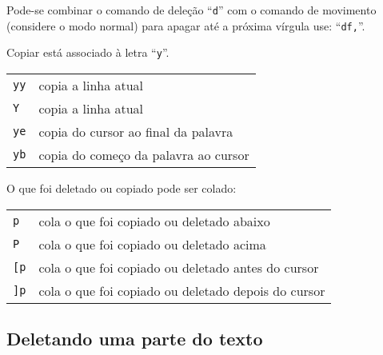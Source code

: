 {\Large {}} Pode-se combinar o comando de deleção ``\verb+d+'' com o
comando de movimento (considere o modo normal) para apagar até a
próxima vírgula use: ``\verb+df,+''. 

Copiar está associado à letra ``\verb|y|''.

\begin{table}[htb]\begin{center} \begin{tabular}{ll} \hline
     \verb|yy| & copia a linha atual \\
     \verb|Y| & copia a linha atual \\
     \verb|ye| & copia do cursor ao final da palavra \\
     \verb|yb| & copia do começo da palavra ao cursor \\
\hline \end{tabular}\end{center}\end{table}


O que foi deletado ou copiado pode ser colado:
\begin{table}[htb]\begin{center} \begin{tabular}{ll} \hline
     \verb|p| & cola o que foi copiado ou deletado abaixo \\
     \verb|P| & cola o que foi copiado ou deletado acima  \\
     \verb|[p| & cola o que foi copiado ou deletado antes do cursor \\
     \verb|]p| & cola o que foi copiado ou deletado depois do cursor \\ 
\hline \end{tabular}\end{center}\end{table}


\subsection{Deletando uma parte do texto}\label{Deletando uma parte do texto}

